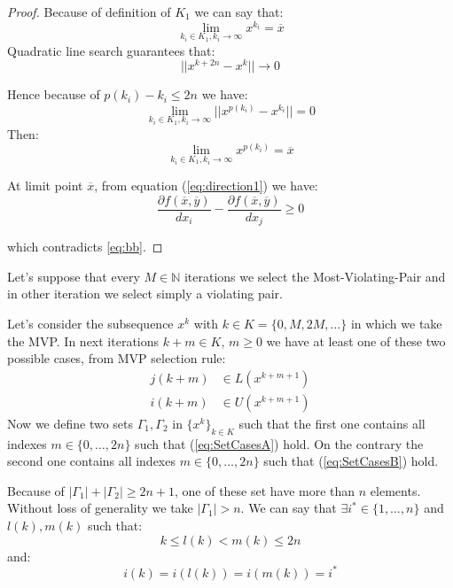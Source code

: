 \begin{proof}
Because of  definition of $K_1$ we can say that:
\begin{equation}
 \lim_{k_i \in K_1, k_i \rightarrow \infty} x^{k_i} =\overline{x}
\end{equation}
Quadratic line search guarantees that:
\begin{equation}
 ||x^{k+2n}-x^{k}|| \rightarrow 0
\end{equation}

Hence because of $p(k_i)-k_i \le 2n$ we have:
\begin{equation}
 \lim_{k_i \in K_1,k_i\rightarrow \infty}  ||x^{p(k_i)}-x^{k_i}||=0
\end{equation}
Then:
\begin{equation}
 \lim_{k_i \in K_1,k_i\rightarrow \infty} x^{p(k_i)}=\overline{x}
\end{equation}

At limit point $\overline{x}$, from equation (\ref{eq:direction1})  we have: 
\begin{equation*}
 \frac{\partial f(\overline{x},\overline{y})}{dx_i} - \frac{\partial f(\overline{x},\overline{y})}{dx_{j}} \ge 0
\end{equation*}

which contradicts \ref{eq:bb}.
\end{proof}
\fi
 Let's suppose that every $M \in \mathbb{N}$ iterations we select the Most-Violating-Pair and in other iteration we select simply a violating pair.
 
 Let's consider the subsequence $x^{k}$ with $k  \in K =\{0,M,2M,\ldots\}$ in which we take the MVP.
 In next iterations $k+m \in K$, $m\ge 0$ we have at least one of these two possible cases, from MVP selection rule:
\begin{subequations}
\begin{align}
 j(k+m) &\in L(x^{k+m+1})\label{eq:SetCasesA}\\
 i(k+m) &\in U(x^{k+m+1})\label{eq:SetCasesB}
\end{align}
\end{subequations}
Now we define two sets $\Gamma_1,\Gamma_2$ in $\{x^{k}\}_{k \in K}$ such that the first one contains all indexes $m \in\{0,\ldots,2n\}$ such that (\ref{eq:SetCasesA}) hold.
On the contrary the second one contains all indexes $m \in\{0,\ldots,2n\}$ such that (\ref{eq:SetCasesB}) hold.

Because of $|\Gamma_1|+|\Gamma_2|\ge2n+1$, one of these set have more than $n$ elements. Without loss of generality we take $|\Gamma_1|> n$.
 We can say that $\exists i^* \in \{1,\ldots,n\}$ and $l(k),m(k)$ such that:
 \begin{equation}
  k\le l(k) <m(k)\le2 n
 \end{equation}
and:
\begin{equation}
 i(k) = i(l(k))=i(m(k))=i^*
\end{equation}

